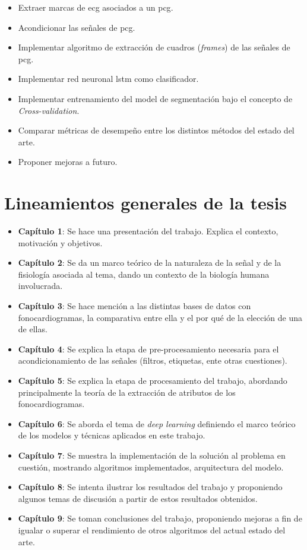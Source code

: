     \begin{itemize}
        \item Extraer marcas de \acrshort{ecg} asociados a un \acrshort{pcg}.
        \item Acondicionar las señales de \acrshort{pcg}.
        \item Implementar algoritmo de extracción de cuadros (\textit{frames}) de las señales de \acrshort{pcg}.
        \item Implementar red neuronal \acrshort{lstm} como clasificador.
        \item Implementar entrenamiento del model de segmentación bajo el concepto de \textit{Cross-validation}.
        \item Comparar métricas de desempeño entre los distintos métodos del estado del arte.
        \item Proponer mejoras a futuro.
    \end{itemize}

\newpage 

\section{Lineamientos generales de la tesis}

\begin{itemize}
	\item \textbf{Capítulo 1}: Se hace una presentación del trabajo. Explica el contexto, motivación y objetivos.
	\item \textbf{Capítulo 2}: Se da un marco teórico de la naturaleza de la señal y de la fisiología asociada al tema, dando un contexto de la biología humana involucrada.
    \item \textbf{Capítulo 3}: Se hace mención a las distintas bases de datos con fonocardiogramas, la comparativa entre ella y el por qué de la elección de una de ellas.
    \item \textbf{Capítulo 4}: Se explica la etapa de pre-procesamiento necesaria para el acondicionamiento de las señales (filtros, etiquetas, ente otras cuestiones).
    \item \textbf{Capítulo 5}: Se explica la etapa de procesamiento del trabajo, abordando principalmente la teoría de la extracción de atributos de los fonocardiogramas.
     \item \textbf{Capítulo 6}: Se aborda el tema de \textit{deep learning} definiendo el marco teórico de los modelos y técnicas aplicados en este trabajo. 
     \item \textbf{Capítulo 7}: Se muestra la implementación de la solución al problema en cuestión, mostrando algoritmos implementados, arquitectura del modelo.
     \item \textbf{Capítulo 8}: Se intenta ilustrar los resultados del trabajo y proponiendo algunos temas de discusión a partir de estos resultados obtenidos.
     \item \textbf{Capítulo 9}: Se toman conclusiones del trabajo, proponiendo mejoras a fin de igualar o superar el rendimiento de otros algoritmos del actual estado del arte.
\end{itemize}
